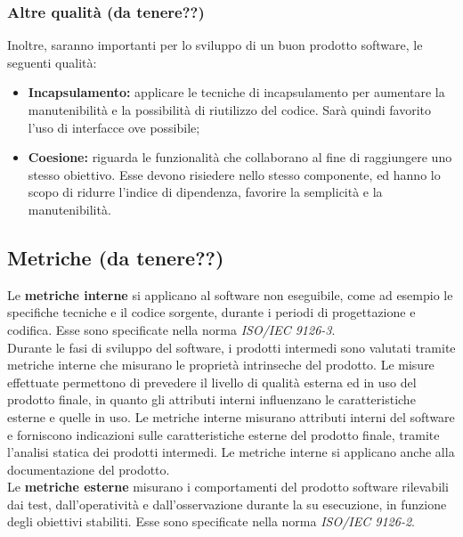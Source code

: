 	\subsubsection{Altre qualità (da tenere??)}
	Inoltre, saranno importanti per lo sviluppo di un buon prodotto software, le seguenti qualità:	
		\begin{itemize}
			\item \textbf{Incapsulamento:} applicare le tecniche di incapsulamento per aumentare la manutenibilità
			e la possibilità di riutilizzo del codice. Sarà quindi favorito l’uso di interfacce ove
			possibile;
			\item \textbf{Coesione:} riguarda le funzionalità che collaborano al fine di raggiungere uno stesso obiettivo. Esse devono risiedere nello stesso componente, ed hanno lo scopo di ridurre l’indice di dipendenza, favorire la semplicità e la manutenibilità.
		\end{itemize}
		
	\subsection{Metriche (da tenere??)}
	Le \textbf{metriche interne} si applicano al software non eseguibile, come ad esempio le specifiche tecniche e il codice sorgente, durante i periodi di progettazione e codifica.
	Esse sono specificate nella norma \textit{ISO/IEC 9126-3}.\\
	Durante le fasi di sviluppo del software, i prodotti intermedi sono valutati tramite metriche interne che misurano le proprietà intrinseche del prodotto.
	Le misure effettuate permettono di prevedere il livello di qualità esterna ed in uso del prodotto finale, in quanto gli attributi interni influenzano le caratteristiche esterne e quelle in uso.
	Le metriche interne misurano attributi interni del software e forniscono indicazioni sulle caratteristiche esterne del prodotto finale, tramite l'analisi statica dei prodotti intermedi.
	Le metriche interne si applicano anche alla documentazione del prodotto.\\
	Le \textbf{metriche esterne} misurano i comportamenti del prodotto software rilevabili dai test, dall'operatività e dall'osservazione durante la su esecuzione, in funzione degli obiettivi stabiliti.
	Esse sono specificate nella norma \textit{ISO/IEC 9126-2}.
		

